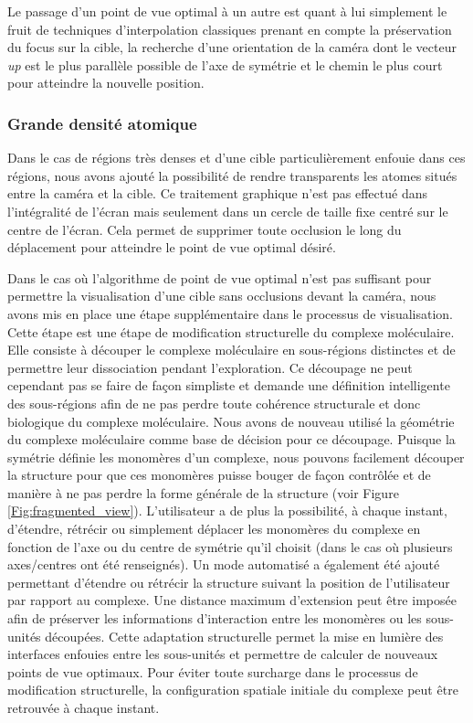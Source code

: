Le passage d'un point de vue optimal à un autre est quant à lui simplement le fruit de techniques d'interpolation classiques prenant en compte la préservation du focus sur la cible, la recherche d'une orientation de la caméra dont le vecteur \textit{up} est le plus parallèle possible de l'axe de symétrie et le chemin le plus court pour atteindre la nouvelle position.

\subsubsection{Grande densité atomique}

Dans le cas de régions très denses et d'une cible particulièrement enfouie dans ces régions, nous avons ajouté la possibilité de rendre transparents les atomes situés entre la caméra et la cible. Ce traitement graphique n'est pas effectué dans l'intégralité de l'écran mais seulement dans un cercle de taille fixe centré sur le centre de l'écran. Cela permet de supprimer toute occlusion le long du déplacement pour atteindre le point de vue optimal désiré.

Dans le cas où l'algorithme de point de vue optimal n'est pas suffisant pour permettre la visualisation d'une cible sans occlusions devant la caméra, nous avons mis en place une étape supplémentaire dans le processus de visualisation. Cette étape est une étape de modification structurelle du complexe moléculaire. Elle consiste à découper le complexe moléculaire en sous-régions distinctes et de permettre leur dissociation pendant l'exploration. Ce découpage ne peut cependant pas se faire de façon simpliste et demande une définition intelligente des sous-régions afin de ne pas perdre toute cohérence structurale et donc biologique du complexe moléculaire. Nous avons de nouveau utilisé la géométrie du complexe moléculaire comme base de décision pour ce découpage. Puisque la symétrie définie les monomères d'un complexe, nous pouvons facilement découper la structure pour que ces monomères puisse bouger de façon contrôlée et de manière à ne pas perdre la forme générale de la structure (voir Figure \ref{Fig:fragmented_view}). L'utilisateur a de plus la possibilité, à chaque instant, d'étendre, rétrécir ou simplement déplacer les monomères du complexe en fonction de l'axe ou du centre de symétrie qu'il choisit (dans le cas où plusieurs axes/centres ont été renseignés). Un mode automatisé a également été ajouté permettant d'étendre ou rétrécir la structure suivant la position de l'utilisateur par rapport au complexe. Une distance maximum d'extension peut être imposée afin de préserver les informations d'interaction entre les monomères ou les sous-unités découpées. Cette adaptation structurelle permet la mise en lumière des interfaces enfouies entre les sous-unités et permettre de calculer de nouveaux points de vue optimaux. Pour éviter toute surcharge dans le processus de modification structurelle, la configuration spatiale initiale du complexe peut être retrouvée à chaque instant.

